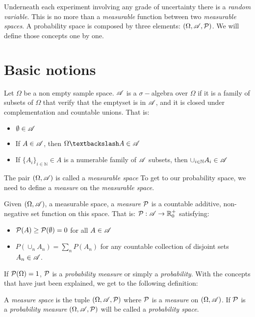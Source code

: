 

Underneath each experiment involving any grade of uncertainty there is a \emph{random variable}. This is no more than a \emph{measurable} function between two \emph{measurable spaces}.
A probability space is composed by three elements: $(\Omega, \mathscr{A}, \mathcal{P})$. We will define those concepts one by one.

\section{Basic notions}

\begin{ndef}Let $\Omega$ be a non empty sample space. $\mathscr{A}$ is a $\sigma-$algebra over $\Omega$ if it is a family of subsets of $\Omega$ that verify that the emptyset is in $\mathscr{A}$, and it is closed under complementation and countable unions. That is:
\begin{itemize}
  \item $\emptyset \in \mathscr{A}$
  \item If $A \in \mathscr{A}$, then $\Omega \textbackslash A \in \Alg$
  \item If $\{A_i\}_{i \in \mathbb N} \in A$ is a numerable family of $\mathscr{A}$ subsets, then $\cup_{i \in \mathbb N} A_i \in \mathscr{A}$
\end{itemize}
\end{ndef}


The pair $(\Omega,\mathscr{A})$ is called a \emph{measurable space} To get to our probability space, we need to define a \emph{measure} on the \emph{measurable space}.

\begin{ndef}
Given $(\Omega,\mathscr{A})$, a measurable space, a \emph{measure} $\mathcal{P}$ is a countable additive, non-negative set function on this space. That is: $\mathcal{P}: \mathscr{A} \to \mathbb R_0^+$ satisfying:
\begin{itemize}
  \item $\mathcal{P}(A) \geq \mathcal{P}(\emptyset) = 0$ for all $A \in \mathscr{A}$
  \item $P(\cup_n A_n) = \sum_n P(A_n)$ for any countable collection of disjoint sets $A_n \in \mathscr{A}$.
\end{itemize}
\end{ndef}

If $\mathcal{P}(\Omega) = 1$, $\mathcal{P}$ is a \emph{probability measure} or simply a \emph{probability}. With the concepts that have just been explained, we get to the following definition:

\begin{ndef}
A \emph{measure space} is the tuple $(\Omega, \mathscr{A},\mathcal{P})$ where $\mathcal{P}$ is a \emph{measure} on $(\Omega, \mathscr{A})$. If $\mathcal{P}$ is a \emph{probability measure} $(\Omega,\mathscr{A},\mathcal{P})$ will be called a \emph{probability space}.
\end{ndef}

